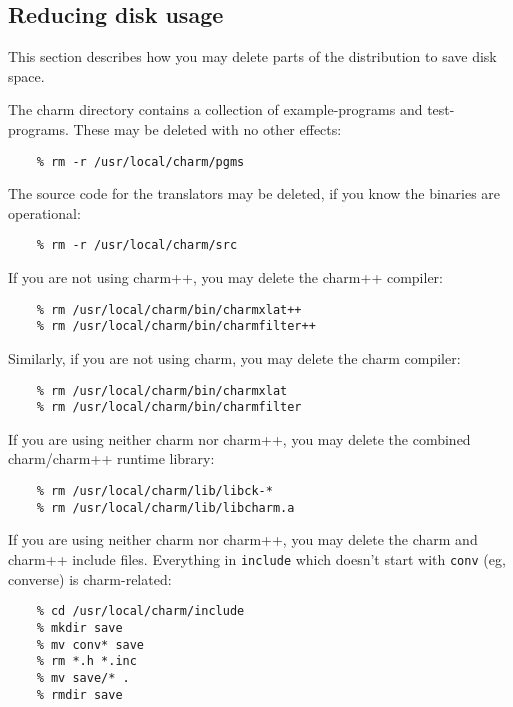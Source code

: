 \subsection{Reducing disk usage}

This section describes how you may delete parts of the distribution to
save disk space.  

The charm directory contains a collection of example-programs and
test-programs.  These may be deleted with no other effects:

\begin{verbatim}
    % rm -r /usr/local/charm/pgms
\end{verbatim}

The source code for the translators may be deleted, if you know the
binaries are operational:

\begin{verbatim}
    % rm -r /usr/local/charm/src
\end{verbatim}

If you are not using charm++, you may delete the charm++ compiler:

\begin{verbatim}
    % rm /usr/local/charm/bin/charmxlat++
    % rm /usr/local/charm/bin/charmfilter++
\end{verbatim}

Similarly, if you are not using charm, you may delete the charm compiler:

\begin{verbatim}
    % rm /usr/local/charm/bin/charmxlat
    % rm /usr/local/charm/bin/charmfilter
\end{verbatim}

If you are using neither charm nor charm++, you may delete the
combined charm/charm++ runtime library:

\begin{verbatim}
    % rm /usr/local/charm/lib/libck-*
    % rm /usr/local/charm/lib/libcharm.a
\end{verbatim}

If you are using neither charm nor charm++, you may delete the charm
and charm++ include files.  Everything in {\tt include} which doesn't
start with {\tt conv} (eg, converse) is charm-related:

\begin{verbatim}
    % cd /usr/local/charm/include
    % mkdir save
    % mv conv* save
    % rm *.h *.inc
    % mv save/* .
    % rmdir save
\end{verbatim}

